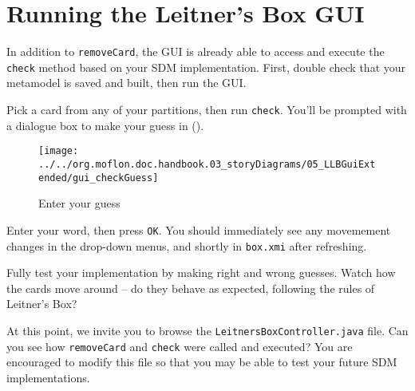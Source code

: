 \newpage
\hypertarget{sec:extendGui}{}
\chapter{Running the Leitner's Box GUI}
\genHeader

In addition to \texttt{removeCard}, the GUI is already able to access and execute the \texttt{check} method based on your SDM implementation. First, double
check that your metamodel is saved and built, then run the GUI. 

\begin{stepbystep}
\item Pick a card from any of your partitions, then run \texttt{check}. You'll be prompted with a dialogue box to make your guess in
().

\vspace{0.5cm}

\begin{figure}[htp]
\begin{center}
  \texttt{[image: ../../org.moflon.doc.handbook.03\_storyDiagrams/05\_LLBGuiExtended/gui\_checkGuess]}
  \caption{Enter your guess}
  \label{eclipse:checkGuess}
\end{center}
\end{figure}

\item Enter your word, then press \texttt{OK}. You should immediately see any movemement changes in the drop-down menus, and shortly in
\texttt{box.xmi} after refreshing.

\vspace{0.5cm}

\item Fully test your implementation by making right and wrong guesses. Watch how the cards move around -- do they
behave as expected, following the rules of Leitner's Box?

\vspace{0.5cm}

\item At this point, we invite you to browse the \texttt{Leitners\-Box\-Control\-ler.java} file. Can you see how \texttt{removeCard} and
\texttt{check} were called and executed? You are encouraged to modify this file so that you may be able to test your future SDM implementations.

\end{stepbystep}

